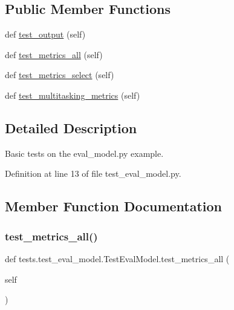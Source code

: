 \subsection*{Public Member Functions}
\begin{DoxyCompactItemize}
\item 
def \hyperlink{classtests_1_1test__eval__model_1_1TestEvalModel_a899d6a41fb8f56be62a7145d9937ee52}{test\+\_\+output} (self)
\item 
def \hyperlink{classtests_1_1test__eval__model_1_1TestEvalModel_a35d01001a5c2f289c98b384e1a53e515}{test\+\_\+metrics\+\_\+all} (self)
\item 
def \hyperlink{classtests_1_1test__eval__model_1_1TestEvalModel_a7b7b27f681704f217f711b04311977c2}{test\+\_\+metrics\+\_\+select} (self)
\item 
def \hyperlink{classtests_1_1test__eval__model_1_1TestEvalModel_a06987267bf1d5f021f3ddcbe489a820f}{test\+\_\+multitasking\+\_\+metrics} (self)
\end{DoxyCompactItemize}


\subsection{Detailed Description}
\begin{DoxyVerb}Basic tests on the eval_model.py example.\end{DoxyVerb}
 

Definition at line 13 of file test\+\_\+eval\+\_\+model.\+py.



\subsection{Member Function Documentation}
\mbox{\label{classtests_1_1test__eval__model_1_1TestEvalModel_a35d01001a5c2f289c98b384e1a53e515}} 
\subsubsection{\texorpdfstring{test\+\_\+metrics\+\_\+all()}{test\_metrics\_all()}}
{\footnotesize\ttfamily def tests.\+test\+\_\+eval\+\_\+model.\+Test\+Eval\+Model.\+test\+\_\+metrics\+\_\+all (\begin{DoxyParamCaption}\item[{}]{self }\end{DoxyParamCaption})}

